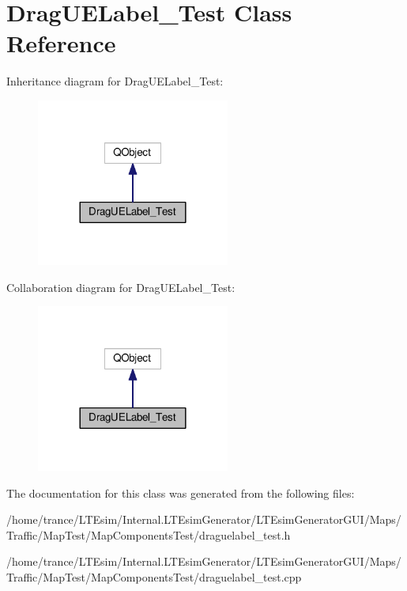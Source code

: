 \hypertarget{class_drag_u_e_label___test}{}\section{Drag\+U\+E\+Label\+\_\+\+Test Class Reference}
\label{class_drag_u_e_label___test}


Inheritance diagram for Drag\+U\+E\+Label\+\_\+\+Test\+:
\nopagebreak
\begin{figure}[H]
\begin{center}
\leavevmode
\includegraphics[width=180pt]{class_drag_u_e_label___test__inherit__graph}
\end{center}
\end{figure}


Collaboration diagram for Drag\+U\+E\+Label\+\_\+\+Test\+:
\nopagebreak
\begin{figure}[H]
\begin{center}
\leavevmode
\includegraphics[width=180pt]{class_drag_u_e_label___test__coll__graph}
\end{center}
\end{figure}


The documentation for this class was generated from the following files\+:\begin{DoxyCompactItemize}
\item 
/home/trance/\+L\+T\+Esim/\+Internal.\+L\+T\+Esim\+Generator/\+L\+T\+Esim\+Generator\+G\+U\+I/\+Maps/\+Traffic/\+Map\+Test/\+Map\+Components\+Test/draguelabel\+\_\+test.\+h\item 
/home/trance/\+L\+T\+Esim/\+Internal.\+L\+T\+Esim\+Generator/\+L\+T\+Esim\+Generator\+G\+U\+I/\+Maps/\+Traffic/\+Map\+Test/\+Map\+Components\+Test/draguelabel\+\_\+test.\+cpp\end{DoxyCompactItemize}
